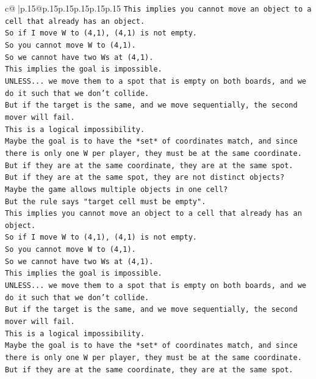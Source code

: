 \documentclass{article}
\begin{document}
{\begin{supertabular}{c@{$\;$}|p{.15\linewidth}@{}p{.15\linewidth}p{.15\linewidth}p{.15\linewidth}p{.15\linewidth}p{.15\linewidth}}
{{{\texttt{This implies you cannot move an object to a cell that already has an object.} \\
\texttt{So if I move W to (4,1), (4,1) is not empty.} \\
\texttt{So you cannot move W to (4,1).} \\
\texttt{So we cannot have two Ws at (4,1).} \\
\texttt{This implies the goal is impossible.} \\
\texttt{UNLESS... we move them to a spot that is empty on both boards, and we do it such that we don't collide.} \\
\texttt{But if the target is the same, and we move sequentially, the second mover will fail.} \\
\texttt{This is a logical impossibility.} \\
\texttt{Maybe the goal is to have the *set* of coordinates match, and since there is only one W per player, they must be at the same coordinate.} \\
\texttt{But if they are at the same coordinate, they are at the same spot.} \\
\texttt{But if they are at the same spot, they are not distinct objects?} \\
\texttt{Maybe the game allows multiple objects in one cell?} \\
\texttt{But the rule says "target cell must be empty".} \\
\texttt{This implies you cannot move an object to a cell that already has an object.} \\
\texttt{So if I move W to (4,1), (4,1) is not empty.} \\
\texttt{So you cannot move W to (4,1).} \\
\texttt{So we cannot have two Ws at (4,1).} \\
\texttt{This implies the goal is impossible.} \\
\texttt{UNLESS... we move them to a spot that is empty on both boards, and we do it such that we don't collide.} \\
\texttt{But if the target is the same, and we move sequentially, the second mover will fail.} \\
\texttt{This is a logical impossibility.} \\
\texttt{Maybe the goal is to have the *set* of coordinates match, and since there is only one W per player, they must be at the same coordinate.} \\
\texttt{But if they are at the same coordinate, they are at the same spot.} \\
}}}
\end{supertabular}}
\end{document}
